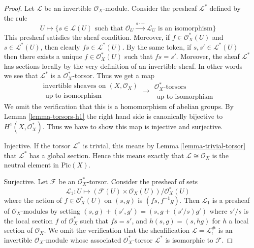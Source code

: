 \begin{proof}
Let $\mathcal{L}$ be an invertible $\mathcal{O}_X$-module.
Consider the presheaf $\mathcal{L}^*$ defined by the rule
$$
U \longmapsto \{s \in \mathcal{L}(U)
\text{ such that } \mathcal{O}_U \xrightarrow{s \cdot -} \mathcal{L}_U
\text{ is an isomorphism}\}
$$
This presheaf satisfies the sheaf condition. Moreover, if
$f \in \mathcal{O}_X^*(U)$ and $s \in \mathcal{L}^*(U)$, then clearly
$fs \in \mathcal{L}^*(U)$. By the same token, if $s, s' \in \mathcal{L}^*(U)$
then there exists a unique $f \in \mathcal{O}_X^*(U)$ such that
$fs = s'$. Moreover, the sheaf $\mathcal{L}^*$ has sections locally
by the very definition of an invertible sheaf. In other words we
see that $\mathcal{L}^*$ is a $\mathcal{O}_X^*$-torsor. Thus we get
a map
$$
\begin{matrix}
\text{invertible sheaves on }(X, \mathcal{O}_X) \\
\text{ up to isomorphism}
\end{matrix}
\longrightarrow
\begin{matrix}
\mathcal{O}_X^*\text{-torsors} \\
\text{ up to isomorphism}
\end{matrix}
$$
We omit the verification that this is a homomorphism of abelian groups.
By
Lemma \ref{lemma-torsors-h1}
the right hand side is canonically
bijective to $H^1(X, \mathcal{O}_X^*)$.
Thus we have to show this map is injective and surjective.

\medskip\noindent
Injective. If the torsor $\mathcal{L}^*$ is trivial, this means by
Lemma \ref{lemma-trivial-torsor}
that $\mathcal{L}^*$ has a global section.
Hence this means exactly that $\mathcal{L} \cong \mathcal{O}_X$ is
the neutral element in $\text{Pic}(X)$.

\medskip\noindent
Surjective. Let $\mathcal{F}$ be an $\mathcal{O}_X^*$-torsor.
Consider the presheaf of sets
$$
\mathcal{L}_1 : U \longmapsto
(\mathcal{F}(U) \times \mathcal{O}_X(U))/\mathcal{O}_X^*(U)
$$
where the action of $f \in \mathcal{O}_X^*(U)$ on
$(s, g)$ is $(fs, f^{-1}g)$. Then $\mathcal{L}_1$ is a presheaf
of $\mathcal{O}_X$-modules by setting
$(s, g) + (s', g') = (s, g + (s'/s)g')$ where $s'/s$ is the local
section $f$ of $\mathcal{O}_X^*$ such that $fs = s'$, and
$h(s, g) = (s, hg)$ for $h$ a local section of $\mathcal{O}_X$.
We omit the verification that the sheafification
$\mathcal{L} = \mathcal{L}_1^\#$ is an invertible $\mathcal{O}_X$-module
whose associated $\mathcal{O}_X^*$-torsor $\mathcal{L}^*$ is isomorphic
to $\mathcal{F}$.
\end{proof}













